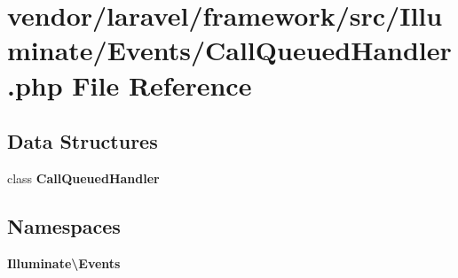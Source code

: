 \section{vendor/laravel/framework/src/\+Illuminate/\+Events/\+Call\+Queued\+Handler.php File Reference}
\label{_events_2_call_queued_handler_8php}
\subsection*{Data Structures}
\begin{DoxyCompactItemize}
\item 
class {\bf Call\+Queued\+Handler}
\end{DoxyCompactItemize}
\subsection*{Namespaces}
\begin{DoxyCompactItemize}
\item 
 {\bf Illuminate\textbackslash{}\+Events}
\end{DoxyCompactItemize}
